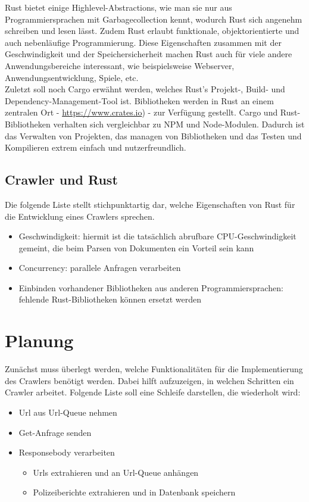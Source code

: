Rust bietet einige Highlevel-Abstractions, wie man sie nur aus
Programmiersprachen mit Garbagecollection kennt, wodurch Rust sich angenehm
schreiben und lesen lässt. Zudem Rust erlaubt funktionale, objektorientierte
und auch nebenläufige Programmierung. Diese Eigenschaften zusammen mit der
Geschwindigkeit und der Speichersicherheit machen Rust auch für viele andere
Anwendungsbereiche interessant, wie beispielsweise Webserver,
Anwendungsentwicklung, Spiele, etc.\\
Zuletzt soll noch Cargo\cite{cargo} erwähnt werden, welches Rust's Projekt-,
Build- und Dependency-Management-Tool ist. Bibliotheken werden in Rust an
einem zentralen Ort - \url{https://www.crates.io}) - zur Verfügung gestellt.
Cargo und Rust-Bibliotheken verhalten sich vergleichbar zu NPM\cite{npm} und
Node\cite{node}-Modulen. Dadurch ist das Verwalten von Projekten, das managen
von Bibliotheken und das Testen und Kompilieren extrem einfach und
nutzerfreundlich.


\subsection{Crawler und Rust}
\label{sub:crawlrust}
Die folgende Liste stellt stichpunktartig dar, welche Eigenschaften von Rust
für die Entwicklung eines Crawlers sprechen.
\begin{itemize}
	\item Geschwindigkeit: hiermit ist die tatsächlich abrufbare
	      CPU-Geschwindigkeit gemeint, die beim Parsen von Dokumenten ein Vorteil
	      sein kann
	\item Concurrency: parallele Anfragen verarbeiten
	\item Einbinden vorhandener Bibliotheken aus anderen Programmiersprachen:
	      fehlende Rust-Bibliotheken können ersetzt werden
\end{itemize}


\section{Planung}
\label{sec:rust_planung}
Zunächst muss überlegt werden, welche Funktionalitäten für die
Implementierung des Crawlers benötigt werden. Dabei hilft aufzuzeigen, in
welchen Schritten ein Crawler arbeitet. Folgende Liste soll eine Schleife
darstellen, die wiederholt wird:
\begin{itemize}
	\item Url aus Url-Queue nehmen
	\item Get-Anfrage senden
	\item Responsebody verarbeiten
	      \begin{itemize}
		      \item Urls extrahieren und an Url-Queue anhängen
		      \item Polizeiberichte extrahieren und in Datenbank speichern
	      \end{itemize}
\end{itemize}

